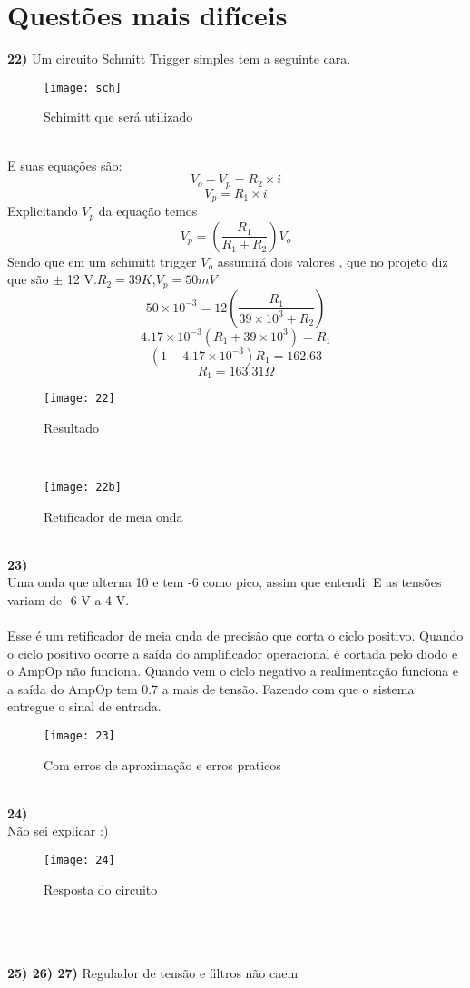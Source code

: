 \documentclass[11pt,a4paper]{article}
\begin{document}
\section*{Questões mais difíceis}
\textbf{22) }
Um circuito Schmitt Trigger simples tem a seguinte cara.
\begin{figure}[!h]
\begin{center}
\texttt{[image: sch]}
\caption{Schimitt que será utilizado}
\end{center}
\end{figure}
\\
E suas equações são:
$$V_o-V_p=R_2\times i$$
$$V_p=R_1\times i$$
Explicitando $V_p$ da equação temos
$$V_p=\left( \frac{R_1}{R_1+R_2}  \right)V_o$$
Sendo que em um schimitt trigger $V_o$ assumirá dois valores , que no projeto diz que são $\pm$ 12 V.$R_2=39K$,$V_p=50mV$
$$50\times 10^{-3}=12 \left( \frac{R_1}{39\times 10^{3}+R_2}  \right)$$
$$4.17\times 10^{-3}(R_1+39\times 10^{3})=R_1$$
$$(1-4.17\times 10^{-3})R_1=162.63$$
$$R_1=163.31 \Omega$$
\begin{figure}[!h]
\begin{center}
\texttt{[image: 22]}
\caption{Resultado}
\end{center}
\end{figure}
\\
\begin{figure}[!h]
\begin{center}
\texttt{[image: 22b]}
\caption{Retificador de meia onda}
\end{center}
\end{figure}
\\
\newpage
\textbf{23) }\\
Uma onda que alterna 10 e tem -6 como pico, assim que entendi. E as tensões variam de -6 V a 4 V.\\\\
Esse é um retificador de meia onda de precisão que corta o ciclo positivo. Quando o ciclo positivo ocorre a saída do amplificador operacional é cortada pelo diodo  e o AmpOp não funciona. Quando vem o ciclo negativo a realimentação funciona e a saída do AmpOp tem 0.7 a mais de tensão. Fazendo com que o sistema entregue o sinal de entrada.
\\
\begin{figure}[!h]
\begin{center}
\texttt{[image: 23]}
\caption{Com erros de aproximação e erros praticos}
\end{center}
\end{figure}
\\
\newpage
\textbf{24) }\\
Não sei explicar :)
\begin{figure}[!h]
\begin{center}
\texttt{[image: 24]}
\caption{Resposta do circuito }
\end{center}
\end{figure}
\\
\\\\
\textbf{25) 26) 27)}
Regulador de tensão e filtros não caem
\end{document}
